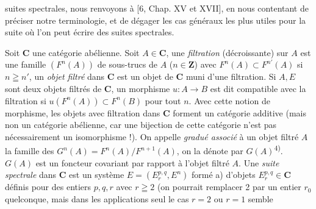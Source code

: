 
\noindent suites spectrales, nous renvoyons à [6, Chap. XV et XVII], en nous
contentant de préciser notre terminologie, et de dégager les cas généraux les
plus utiles pour la suite où l'on peut écrire des suites spectrales.

Soit $\mathbf{C}$ une catégorie abélienne. Soit $A\in \mathbf{C}$, une \textit{filtration}
(décroissante) sur $A$ est une famille $(F^n(A))$ de sous-trucs de $A$
($n\in\mathbf Z$) avec $F^n(A)\subset F^{n'}(A)$ si $n\geqq n'$, un
\textit{objet filtré} dans $\mathbf{C}$ est un objet de $\mathbf{C}$ muni d'une filtration. Si
$A,E$ sont deux objets filtrés de $\mathbf{C}$, un morphisme $u:A\to B$ est
dit compatible avec la filtration si $u(F^n(A))\subset F^n(B)$ pour tout $n$.
Avec cette notion de morphisme, les objets avec filtration dans $\mathbf{C}$ forment un
catégorie additive (mais non un catégorie abélienne, car une bijection de cette
catégorie n'est pas nécessairement un isomorphisme !).
On appelle \textit{gradué associé} à un objet filtré $A$ la famille des
$G^n(A)=F^n(A)/F^{n+1}(A)$, on la dénote par $G(A)$\textsuperscript{4)}. $G(A)$ est un foncteur covariant par rapport à
l'objet filtré $A$.
Une \textit{suite spectrale} dans $\mathbf{C}$ est un système
$E=(E_r^{p,q},E^n)$ formé a) d'objets $E_r^{p,q}\in \mathbf{C}$ définis pour des
entiers $p,q,r$ avec $r\geqq2$ (on pourrait remplacer 2 par un entier $r_0$
quelconque, mais dans les applications seul le cas $r=2$ ou $r=1$ semble

